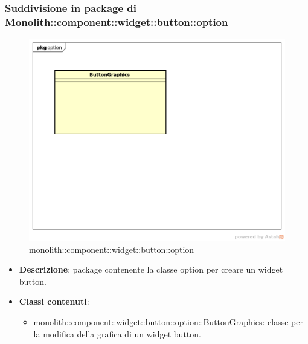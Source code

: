 \subsubsection{Suddivisione in package  di Monolith::component::widget::button::option}
\label{monolith::component::widget::button::option}
\begin{figure}[H]
	\centering
	\includegraphics[scale=0.5]{Sezioni/imgPackage/component_widget_button_option.png}
	\caption{monolith::component::widget::button::option}
\end{figure}
\begin{itemize}
	\item{\textbf{Descrizione}}: package contenente la classe option per creare un widget button.
	\item{\textbf{Classi contenuti}}:
	\begin{itemize}
	\item{monolith::component::widget::button::option::ButtonGraphics}: classe per la modifica della grafica di un widget button.
	\end{itemize}
\end{itemize}

